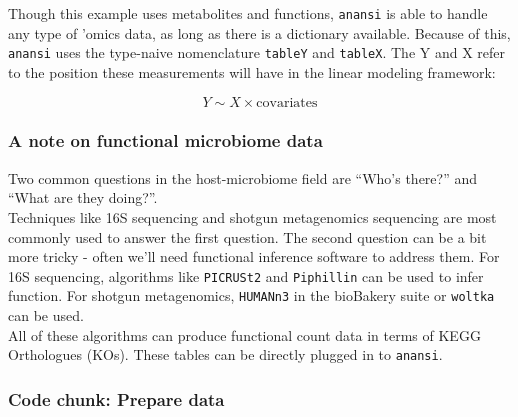 \documentclass[
]{article}
\begin{document}
Though this example uses metabolites and functions, \texttt{anansi} is
able to handle any type of 'omics data, as long as there is a dictionary
available. Because of this, \texttt{anansi} uses the type-naive
nomenclature \texttt{tableY} and \texttt{tableX}. The Y and X refer to
the position these measurements will have in the linear modeling
framework:

\[Y \sim X \times {\text{covariates}}\] \newpage

\hypertarget{a-note-on-functional-microbiome-data}{%
\subsubsection{A note on functional microbiome
data}\label{a-note-on-functional-microbiome-data}}

Two common questions in the host-microbiome field are ``Who's there?''
and ``What are they doing?''.\\
Techniques like 16S sequencing and shotgun metagenomics sequencing are
most commonly used to answer the first question. The second question can
be a bit more tricky - often we'll need functional inference software to
address them. For 16S sequencing, algorithms like \texttt{PICRUSt2} and
\texttt{Piphillin} can be used to infer function. For shotgun
metagenomics, \texttt{HUMANn3} in the bioBakery suite or \texttt{woltka}
can be used.\\
All of these algorithms can produce functional count data in terms of
KEGG Orthologues (KOs). These tables can be directly plugged in to
\texttt{anansi}.

\hypertarget{code-chunk-prepare-data}{%
\subsubsection{Code chunk: Prepare data}\label{code-chunk-prepare-data}}
\end{document}
